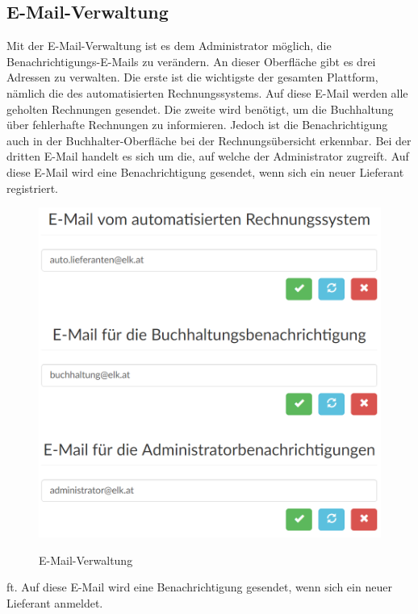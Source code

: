 \subsection{E-Mail-Verwaltung}
Mit der E-Mail-Verwaltung ist es dem Administrator möglich, die Benachrichtigungs-E-Mails zu verändern. An dieser Oberfläche gibt es drei Adressen zu verwalten. Die erste ist die wichtigste der gesamten Plattform, nämlich die des automatisierten Rechnungssystems. Auf diese E-Mail werden alle geholten Rechnungen gesendet. Die zweite wird benötigt, um die Buchhaltung über fehlerhafte Rechnungen zu informieren. Jedoch ist die Benachrichtigung auch in der Buchhalter-Oberfläche bei der Rechnungsübersicht erkennbar. Bei der dritten E-Mail handelt es sich um die, auf welche der Administrator zugreift. Auf diese E-Mail wird eine Benachrichtigung gesendet, wenn sich ein neuer Lieferant registriert.
\begin{figure}[!h]
    \centering
    \includegraphics[width=15cm]{figures/emails.png}
    \label{fig:emailsverwaltung}
    \caption{E-Mail-Verwaltung}
\end{figure}ft. Auf diese E-Mail wird eine Benachrichtigung gesendet, wenn sich ein neuer Lieferant anmeldet.
